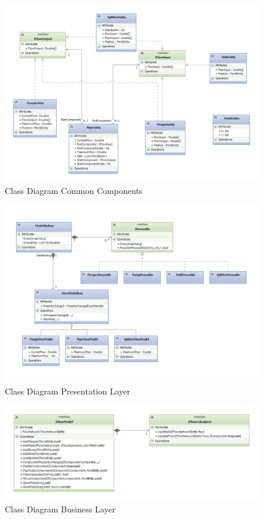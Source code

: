 \begin{figure}
	\centering
	\includegraphics[width=\textwidth]{figures/ClassCommonComponents.pdf}
	\caption{Class Diagram Common Components}
	\label{fig:classcomponents}
\end{figure}

\begin{figure}
	\centering
	\includegraphics[width=\textwidth]{figures/PresentationOverall.pdf}
	\caption{Class Diagram Presentation Layer}
	\label{fig:presentationoverall}
\end{figure}

\begin{figure}
	\centering
	\includegraphics[width=\textwidth]{figures/BusinessOverall.pdf}
	\caption{Class Diagram Business Layer}
	\label{fig:businesslayer}
\end{figure}